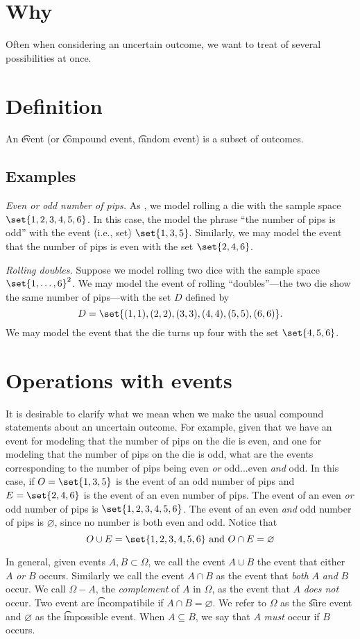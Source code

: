 
\section*{Why}

Often when considering an uncertain outcome, we want to treat of several possibilities at once.

\section*{Definition}

An \t{event} (or \t{compound event}, \t{random event}) is a subset of outcomes.

\subsection*{Examples}

\textit{Even or odd number of pips.}
As , we model rolling a die with the sample space $\set{1, 2, 3, 4, 5, 6}$.
In this case, the model the phrase ``the number of pips is odd'' with the event (i.e., set) $\set{1, 3, 5}$.
Similarly, we may model the event that the number of pips is even with the set $\set{2, 4, 6}$.

\textit{Rolling doubles.}
Suppose we model rolling two dice with the sample space $\set{1,\dots ,6}^2$.
We may model the event of rolling ``doubles''---the two die show the same number of pips---with the set $D$ defined by
\[
D = \set{(1,1),(2,2),(3,3),(4,4),(5,5),(6,6)}.
\]
We may model the event that the die turns up four with the set $\set{4, 5, 6}$.

\section*{Operations with events}

It is desirable to clarify what we mean when we make the usual compound statements about an uncertain outcome.
For example, given that we have an event for modeling that the number of pips on the die is even, and one for modeling that the number of pips on the die is odd, what are the events corresponding to the number of pips being even \textit{or} odd...even \textit{and} odd.
In this case, if $O = \set{1,3,5}$ is the event of an odd number of pips and $E = \set{2,4,6}$ is the event of an even number of pips.
The event of an even \textit{or} odd number of pips is $\set{1,2,3,4,5,6}$.
The event of an even \textit{and} odd number of pips is $\varnothing$, since no number is both even and odd.
Notice that
\[
O \cup E = \set{1,2,3,4,5,6} \text{ and } O \cap  E = \varnothing
\]

In general, given events $A, B \subset \Omega $, we call the event $A \cup B$ the event that either $A$ \textit{or} $B$ occurs.
Similarly we call the event $A \cap  B$ as the event that \textit{both} $A$ \textit{and} $B$ occur.
We call $\Omega  - A$, the \textit{complement} of $A$ in $\Omega $, as the event that $A$ \textit{does not} occur.
Two event are \t{incompatibile} if $A \cap  B = \varnothing$.
We refer to $\Omega $ as the \t{sure event} and $\varnothing$ as the \t{impossible event}.
When $A \subseteq B$, we say that $A$ \textit{must} occur if $B$ occurs.

\blankpage